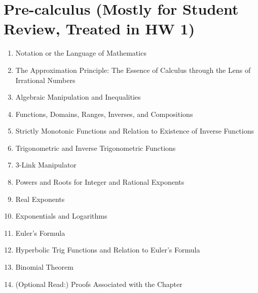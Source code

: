\section*{Pre-calculus (Mostly for Student Review, Treated in HW 1)}
\begin{enumerate}                                                                 
\item Notation or the Language of Mathematics 
   \item The Approximation Principle: The Essence of Calculus through the Lens of Irrational Numbers 
   \item Algebraic Manipulation and Inequalities 
  \item Functions, Domains, Ranges, Inverses, and Compositions 
  \item Strictly Monotonic Functions and Relation to Existence of Inverse Functions 
  \item Trigonometric and Inverse Trigonometric Functions 
  \item 3-Link Manipulator
  \item Powers and Roots for Integer and Rational Exponents
  \item Real Exponents
  \item Exponentials and Logarithms 
  \item Euler’s Formula 
  \item Hyperbolic Trig Functions and Relation to Euler’s Formula 
  \item Binomial Theorem 
  \item (Optional Read:) Proofs Associated with the Chapter
\end{enumerate}



